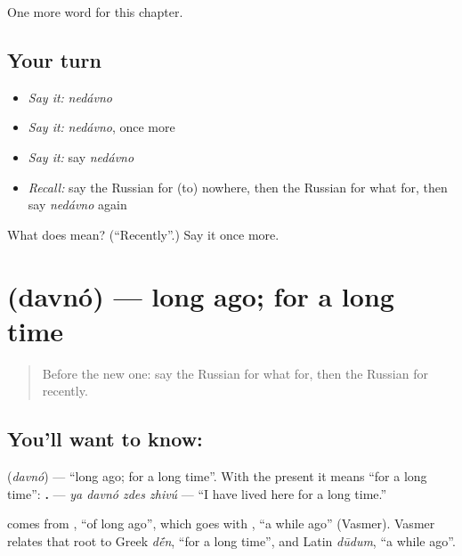 \begin{grammarlens}[title={What you've built}]
One more word for this chapter.
\end{grammarlens}

\subsection*{Your turn}
\begin{itemize}
\raggedright
  \item \emph{Say it:} \emph{nedávno}
  \item \emph{Say it:} \emph{nedávno}, once more
  \item \emph{Say it:} say \emph{nedávno}
  \item \emph{Recall:} say the Russian for (to) nowhere, then the Russian for what for, then say \emph{nedávno} again
\end{itemize}

\begin{tcolorbox}[breakable,colback=teal!4,colframe=teal!35!black,title={Before you move on}]
What does  mean? (\textquotedblleft{}Recently\textquotedblright{}.) Say it once more.
\end{tcolorbox}
\section[\texorpdfstring{\ru{давно} (davnó)}{давно (davnó)}]{ (davnó) — long ago; for a long time}

\label{lesson:RU-C137-davno}



\begin{quote}
Before the new one: say the Russian for what for, then the Russian for recently.
\end{quote}

\subsection*{You'll want to know: }
\textbf{} (\emph{davnó}) — \textquotedblleft{}long ago; for a long time\textquotedblright{}. With the present it means \textquotedblleft{}for a long time\textquotedblright{}: \textbf{   .} — \emph{ya davnó zdes zhivú} — \textquotedblleft{}I have lived here for a long time.\textquotedblright{}

\begin{cousinweb}
\textbf{} comes from \emph{}, \textquotedblleft{}of long ago\textquotedblright{}, which goes with \emph{}, \textquotedblleft{}a while ago\textquotedblright{} (Vasmer). Vasmer relates that root to Greek \emph{d\'{\={e}}n}, \textquotedblleft{}for a long time\textquotedblright{}, and Latin \emph{dūdum}, \textquotedblleft{}a while ago\textquotedblright{}.
\end{cousinweb}

